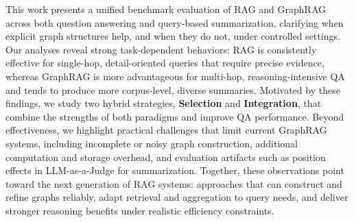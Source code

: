 This work presents a unified benchmark evaluation of RAG and GraphRAG across both question answering and query-based summarization, clarifying when explicit graph structures help, and when they do not, under controlled settings. Our analyses reveal strong task-dependent behaviors: RAG is consistently effective for single-hop, detail-oriented queries that require precise evidence, whereas GraphRAG is more advantageous for multi-hop, reasoning-intensive QA and tends to produce more corpus-level, diverse summaries.
Motivated by these findings, we study two hybrid strategies, \textbf{Selection} and \textbf{Integration}, that combine the strengths of both paradigms and improve QA performance. Beyond effectiveness, we highlight practical challenges that limit current GraphRAG systems, including incomplete or noisy graph construction, additional computation and storage overhead, and evaluation artifacts such as position effects in LLM-as-a-Judge for summarization. Together, these observations point toward the next generation of RAG systems: approaches that can construct and refine graphs reliably, adapt retrieval and aggregation to query needs, and deliver stronger reasoning benefits under realistic efficiency constraints.
